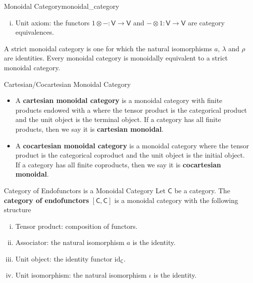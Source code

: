\begin{definition}{Monoidal Category}{monoidal_category}
\begin{enumerate}[(i)]
\[\begin{tikzcd}[ampersand replacement=\&, column sep=small]
(A\otimes( B\otimes C))\otimes D \arrow[rd, "{a_{(A,B\otimes C,D)}}"'] \&                                                                                    \&    \&       \& (A\otimes B)\otimes (C\otimes D) \arrow[ld, "{a_{(A, B, C\otimes D)}}"] \\[+35pt]
            \& A\otimes( (B\otimes C)\otimes D) \arrow[rr, "{\mathrm{id}_A\otimes a_{(B,C,D)}}"'] \&    \& A\otimes( B\otimes (C\otimes D)) \&                                                                        
\end{tikzcd}
    \]
    \item Unit axiom: the functors $1\otimes -:\mathsf{V}\to\mathsf{V}$ and $-\otimes 1:\mathsf{V}\to\mathsf{V}$ are category equivalences.
    \end{enumerate}
\end{definition}


A strict monoidal category is one for which the natural isomorphisms $a$, $\lambda$ and $\rho$ are identities. Every monoidal category is monoidally equivalent to a strict monoidal category.

\begin{definition}{Cartesian/Cocartesian Monoidal Category}{}
    \begin{itemize}[leftmargin=8pt]
        \item A \textbf{cartesian monoidal category} is a monoidal category with finite products endowed with a where the tensor product is the categorical product and the unit object is the terminal object. If a category has all finite products, then we say it is \textbf{cartesian monoidal}. 
        \item A \textbf{cocartesian monoidal category} is a monoidal category where the tensor product is the categorical coproduct and the unit object is the initial object. If a category has all finite coproducts, then we say it is \textbf{cocartesian monoidal}.
    \end{itemize}
\end{definition}


\begin{example}{Category of Endofunctors is a Monoidal Category}{}
    Let $\mathsf{C}$ be a category. The \textbf{category of endofunctors} $\left[\mathsf{C},\mathsf{C}\right]$ is a monoidal category with the following structure
    \begin{enumerate}[(i)]
        \item Tensor product: composition of functors.
        \item Associator: the natural isomorphism $a$ is the identity.
        \item Unit object: the identity functor $\mathrm{id}_{\mathsf{C}}$.
        \item Unit isomorphism: the natural isomorphism $\iota$ is the identity.
    \end{enumerate}
\end{example}


